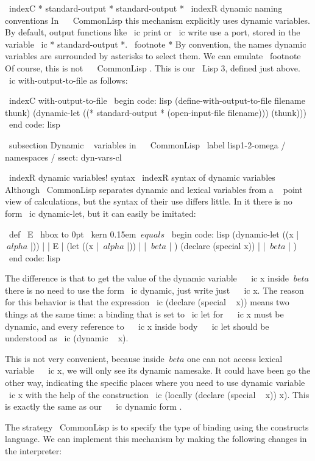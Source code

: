 \ indexC * {standard-output} {* standard-output *}
\ indexR {dynamic naming conventions}
In ~ { \ CommonLisp } this mechanism explicitly uses dynamic variables.
By default, output functions like \ ic {print} or \ ic {write} use a port,
stored in the variable \ ic {* standard-output *}. \ footnote * {By convention, the names
dynamic variables are surrounded by asterisks to select them.} We can
emulate \ footnote {Of course, this is not ~ { \ CommonLisp }. This is our \ Lisp 3,
defined just above.} \ ic {with-output-to-file} as follows:

\ indexC {with-output-to-file}
\ begin {code: lisp}
(define-with-output-to-file filename thunk)
  (dynamic-let ((* standard-output * (open-input-file filename)))
    (thunk)))
\ end {code: lisp}


\ subsection {Dynamic ~ variables in ~ { \ CommonLisp }} %
\ label {lisp1-2-omega / namespaces / ssect: dyn-vars-cl}

\ indexR {dynamic variables! syntax}
\ indexR {syntax of dynamic variables}
Although { \ CommonLisp } separates dynamic and lexical variables from a ~ point
view of calculations, but the syntax of their use differs little. In it there is no
form \ ic {dynamic-let}, but it can easily be imitated:

{ \ def \ E { \ hbox to 0pt { \ kern 0.15em $ \ equals $ }}
\ begin {code: lisp}
(dynamic-let ((x | $ \ alpha $ |)) | | E | (let ((x | $ \ alpha $ |))
  | | $ \ beta $ | ) (declare (special x))
                          | | $ \ beta $ | )
\ end {code: lisp}}

The difference is that to get the value of the dynamic variable ~ \ ic {x}
inside $ \ beta $ there is no need to use the form \ ic {dynamic}, just write
just ~ \ ic {x}. The reason for this behavior is that the expression \ ic {(declare
(special ~ x))} means two things at the same time: a binding that is set to \ ic {let}
for ~ \ ic {x} must be dynamic, and every reference to ~ \ ic {x} inside
body ~ \ ic {let} should be understood as \ ic {(dynamic ~ x)}.

This is not very convenient, because inside $ \ beta $ one can not access lexical
variable ~ \ ic {x}, we will only see its dynamic namesake. It could have been
go the other way, indicating the specific places where you need to use
dynamic variable ~ \ ic {x} with the help of the construction \ ic {(locally (declare
(special ~ x)) x)}. This is exactly the same as our ~ \ ic {dynamic} form .

The strategy { \ CommonLisp } is to specify the type of binding using the constructs
language. We can implement this mechanism by making the following changes
in the interpreter:

